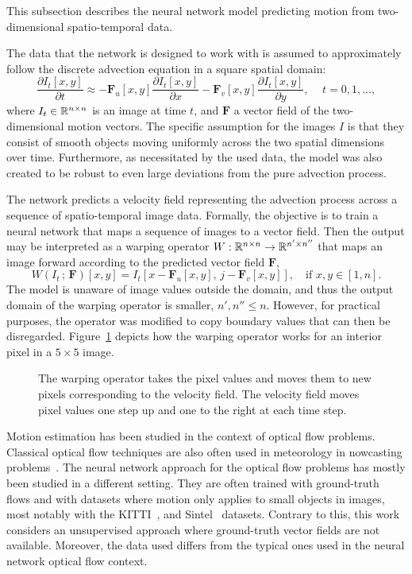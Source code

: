 This subsection describes the neural network model predicting motion from two-dimensional spatio-temporal data.

The data that the network is designed to work with is assumed to approximately follow the discrete advection equation in a square spatial domain:
\begin{equation*}
    \frac{\partial I_t[x,y]}{\partial t} \approx -\mathbf{F}_{u}[x,y] \frac{\partial I_{t}[x,y]}{\partial x} -\mathbf{F}_{v}[x,y] \frac{\partial I_{t}[x,y]}{\partial y}, \quad \, t = 0,1,\dots,
\end{equation*}
where $I_t \in \mathbb{R}^{n \times n}$ is an image at time $t$, and $\mathbf{F}$ a vector field of the two-dimensional motion vectors.
The specific assumption for the images $I$ is that they consist of smooth objects moving uniformly across the two spatial dimensions over time.
Furthermore, as necessitated by the used data, the model was also created to be robust to even large deviations from the pure advection process.

The network predicts a velocity field representing the advection process across a sequence of spatio-temporal image data.
Formally, the objective is to train a neural network that maps a sequence of images to a vector field.
Then the output may be interpreted as a warping operator $W: \mathbb{R}^{n \times n} \rightarrow \mathbb{R}^{n' \times n''}$ that maps an image forward according to the predicted vector field $\mathbf{F}$,
\begin{equation}\label{eq:warping}
    W(I_t\, ;\, \mathbf{F})[x,y] = I_{t}[x-\mathbf{F}_{u}[x,y], \, j - \mathbf{F}_{v}[x,y]], \quad \text{if } x, y \in [1,n].
\end{equation}
The model is unaware of image values outside the domain, and thus the output domain of the warping operator is smaller, $n', n'' \leq n$.
However, for practical purposes, the operator was modified to copy boundary values that can then be disregarded.
Figure~\ref{fig:warping} depicts how the warping operator works for an interior pixel in a $5 \times 5$ image.

\begin{figure}[H]
    \centering
    \caption{\label{fig:warping}The warping operator takes the pixel values and moves them to new pixels corresponding to the velocity field.
    The velocity field moves pixel values one step up and one to the right at each time step.}
\end{figure}

Motion estimation has been studied in the context of optical flow problems.
Classical optical flow techniques are also often used in meteorology in nowcasting problems~\cite{pulkkinenetal}.
The neural network approach for the optical flow problems has mostly been studied in a different setting.
They are often trained with ground-truth flows and with datasets where motion only applies to small objects in images, most notably with the KITTI~\cite{kitti}, and Sintel~\cite{sintel} datasets.
Contrary to this, this work considers an unsupervised approach where ground-truth vector fields are not available.
Moreover, the data used differs from the typical ones used in the neural network optical flow context.

